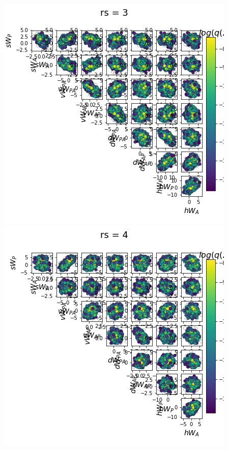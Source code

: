 \documentclass[11pt]{article}
\begin{document}
\begin{center}
\includegraphics[scale=0.33]{figs/Z_SC_full_c=0_p=50_rs=3.png} \\
\includegraphics[scale=0.33]{figs/Z_SC_full_c=0_p=50_rs=4.png}

\end{center}
\end{document}
